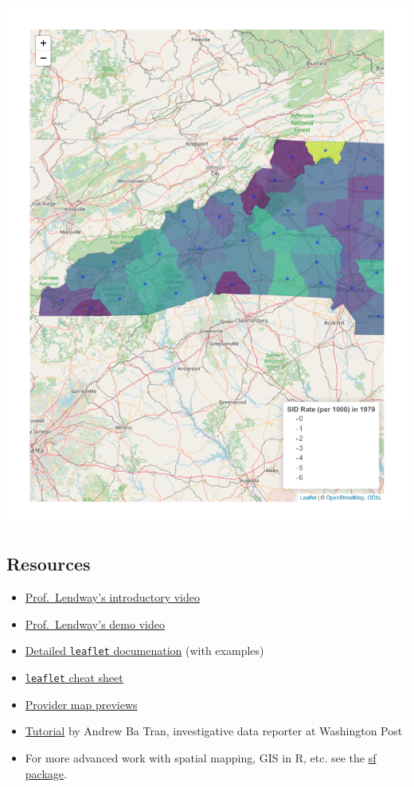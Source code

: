 \documentclass[
  letterpaper,
  DIV=11,
  numbers=noendperiod]{scrreprt}
\providecommand{\tightlist}{%
  \setlength{\itemsep}{0pt}\setlength{\parskip}{0pt}}\usepackage{longtable,booktabs,array}
\begin{document}
\includegraphics{src/06-Spatial_Viz_files/figure-pdf/unnamed-chunk-31-1.pdf}

\subsection*{Resources}\label{resources-2}

\begin{itemize}
\tightlist
\item
  \href{https://www.youtube.com/embed/w5U62wUki3E}{Prof.~Lendway's
  introductory video}\\
\item
  \href{https://www.youtube.com/embed/U07OQ3V-W2k}{Prof.~Lendway's demo
  video}
\item
  \href{https://rstudio.github.io/leaflet/}{Detailed \texttt{leaflet}
  documenation} (with examples)
\item
  \href{https://ugoproto.github.io/ugo_r_doc/pdf/leaflet-cheat-sheet.pdf}{\texttt{leaflet}
  cheat sheet}
\item
  \href{http://leaflet-extras.github.io/leaflet-providers/preview/}{Provider
  map previews}
\item
  \href{https://learn.r-journalism.com/en/mapping/census_maps/census-maps/}{Tutorial}
  by Andrew Ba Tran, investigative data reporter at Washington Post
\item
  For more advanced work with spatial mapping, GIS in R, etc. see the
  \href{https://r-spatial.github.io/sf/}{sf package}.
\end{itemize}
\end{document}

